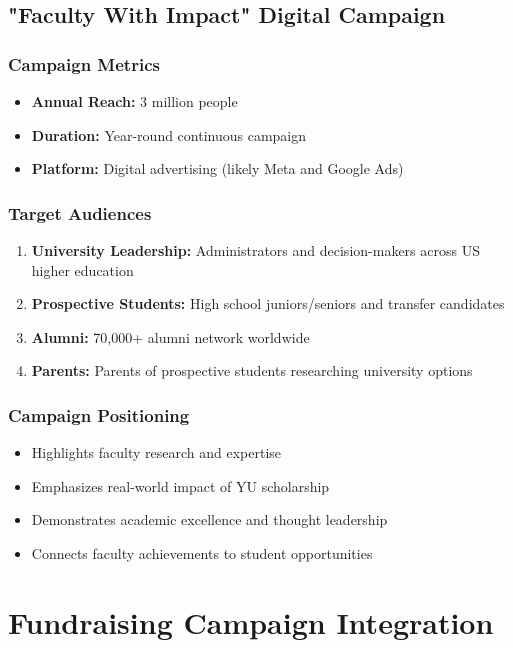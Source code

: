 \documentclass[12pt,letterpaper]{article}
\begin{document}
\subsection{"Faculty With Impact" Digital Campaign}

\subsubsection{Campaign Metrics}
\begin{itemize}[leftmargin=*]
    \item \textbf{Annual Reach:} 3 million people
    \item \textbf{Duration:} Year-round continuous campaign
    \item \textbf{Platform:} Digital advertising (likely Meta and Google Ads)
\end{itemize}

\subsubsection{Target Audiences}
\begin{enumerate}[leftmargin=*]
    \item \textbf{University Leadership:} Administrators and decision-makers across US higher education
    \item \textbf{Prospective Students:} High school juniors/seniors and transfer candidates
    \item \textbf{Alumni:} 70,000+ alumni network worldwide
    \item \textbf{Parents:} Parents of prospective students researching university options
\end{enumerate}

\subsubsection{Campaign Positioning}
\begin{itemize}[leftmargin=*]
    \item Highlights faculty research and expertise
    \item Emphasizes real-world impact of YU scholarship
    \item Demonstrates academic excellence and thought leadership
    \item Connects faculty achievements to student opportunities
\end{itemize}

\section{Fundraising Campaign Integration}
\end{document}
